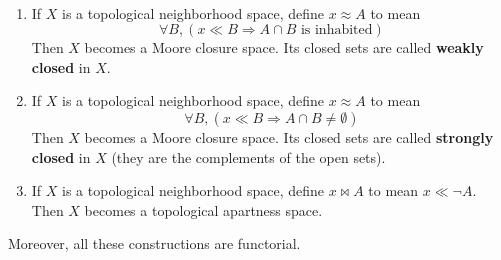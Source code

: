 \documentclass{article}
\def\cpl#1{\neg #1}
\let\implies\Rightarrow
\begin{document}
\begin{thm}\label{thm:toprels}\ 
  \begin{enumerate}
  \item If $X$ is a topological neighborhood space, define $x\approx A$ to mean
    \[\forall B, (x\ll B \implies A\cap B \text{ is inhabited})\]
    Then $X$ becomes a Moore closure space.\label{item:top-ll-wkcl}
    Its closed sets are called \textbf{weakly closed} in $X$.
  \item If $X$ is a topological neighborhood space, define $x\approx A$ to mean
    \[\forall B, (x\ll B \implies A\cap B \neq \emptyset)\]
    Then $X$ becomes a Moore closure space.\label{item:top-ll-strcl}
    Its closed sets are called \textbf{strongly closed} in $X$ (they are the complements of the open sets).
  \item If $X$ is a topological neighborhood space, define $x\bowtie A$ to mean $x\ll \cpl{A}$.
    Then $X$ becomes a topological apartness space.\label{item:top-ll-bowtie}
  \end{enumerate}
  Moreover, all these constructions are functorial.
\end{thm}
\end{document}
